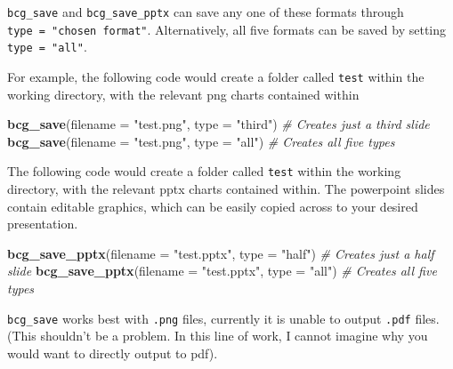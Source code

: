 \documentclass[
]{article}
\newenvironment{Shaded}{\begin{snugshade}}{\end{snugshade}}
\newcommand{\CommentTok}[1]{\textcolor[rgb]{0.56,0.35,0.01}{\textit{#1}}}
\newcommand{\DataTypeTok}[1]{\textcolor[rgb]{0.13,0.29,0.53}{#1}}
\newcommand{\KeywordTok}[1]{\textcolor[rgb]{0.13,0.29,0.53}{\textbf{#1}}}
\newcommand{\NormalTok}[1]{#1}
\newcommand{\StringTok}[1]{\textcolor[rgb]{0.31,0.60,0.02}{#1}}
\begin{document}
\texttt{bcg\_save} and \texttt{bcg\_save\_pptx} can save any one of
these formats through \texttt{type\ =\ "chosen\ format"}. Alternatively,
all five formats can be saved by setting \texttt{type\ =\ "all"}.

For example, the following code would create a folder called
\texttt{test} within the working directory, with the relevant png charts
contained within

\begin{Shaded}
\begin{Highlighting}[]
\KeywordTok{bcg_save}\NormalTok{(}\DataTypeTok{filename =} \StringTok{"test.png"}\NormalTok{, }\DataTypeTok{type =} \StringTok{"third"}\NormalTok{) }\CommentTok{# Creates just a third slide}
\KeywordTok{bcg_save}\NormalTok{(}\DataTypeTok{filename =} \StringTok{"test.png"}\NormalTok{, }\DataTypeTok{type =} \StringTok{"all"}\NormalTok{) }\CommentTok{# Creates all five types}
\end{Highlighting}
\end{Shaded}

The following code would create a folder called \texttt{test} within the
working directory, with the relevant pptx charts contained within. The
powerpoint slides contain editable graphics, which can be easily copied
across to your desired presentation.

\begin{Shaded}
\begin{Highlighting}[]
\KeywordTok{bcg_save_pptx}\NormalTok{(}\DataTypeTok{filename =} \StringTok{"test.pptx"}\NormalTok{, }\DataTypeTok{type =} \StringTok{"half"}\NormalTok{) }\CommentTok{# Creates just a half slide}
\KeywordTok{bcg_save_pptx}\NormalTok{(}\DataTypeTok{filename =} \StringTok{"test.pptx"}\NormalTok{, }\DataTypeTok{type =} \StringTok{"all"}\NormalTok{) }\CommentTok{# Creates all five types}
\end{Highlighting}
\end{Shaded}

\texttt{bcg\_save} works best with \texttt{.png} files, currently it is
unable to output \texttt{.pdf} files. (This shouldn't be a problem. In
this line of work, I cannot imagine why you would want to directly
output to pdf).
\end{document}
